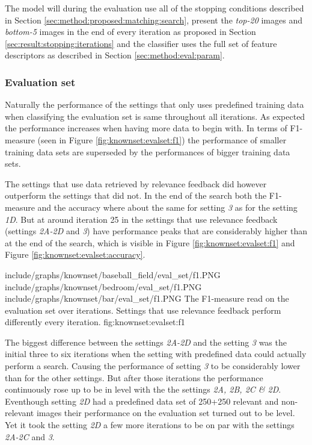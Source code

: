 The model will during the evaluation use all of the stopping conditions described in Section \ref{sec:method:proposed:matching:search}, present the \emph{top-20} images and \emph{bottom-5} images in the end of every iteration as proposed in Section \ref{sec:result:stopping:iterations} and the classifier uses the full set of feature descriptors as described in Section \ref{sec:method:eval:param}. 

\subsubsection{Evaluation set}
\label{sec:res:knownset:eval}
Naturally the performance of the settings that only uses predefined training data when classifying the evaluation set is same throughout all iterations. As expected the performance increases when having more data to begin with. In terms of F1-measure (seen in Figure \ref{fig:knownset:evalset:f1}) the performance of smaller training data sets are superseded by the performances of bigger training data sets. 


The settings that use data retrieved by relevance feedback did however outperform the settings that did not. In the end of the search both the F1-measure and the accuracy where about the same for setting \emph{3} as for the setting \emph{1D}. But at around iteration 25 in the settings that use relevance feedback (settings \emph{2A-2D} and \emph{3}) have performance peaks that are considerably higher than at the end of the search, which is visible in Figure \ref{fig:knownset:evalset:f1} and Figure \ref{fig:knownset:evalset:accuracy}.

\tripfigurenear
{include/graphs/knownset/baseball_field/eval_set/f1.PNG}
{include/graphs/knownset/bedroom/eval_set/f1.PNG}
{include/graphs/knownset/bar/eval_set/f1.PNG}
{The F1-measure read on the evaluation set over iterations. Settings that use relevance feedback perform differently every iteration.}
{fig:knownset:evalset:f1}

The biggest difference between the settings \emph{2A-2D} and the setting \emph{3} was the initial three to six iterations when the setting with predefined data could actually perform a search. Causing the performance of setting \emph{3} to be considerably lower than for the other settings. But after those iterations the performance continuously rose up to be in level with the the settings \emph{2A, 2B, 2C \& 2D}. Eventhough setting \emph{2D} had a predefined data set of 250+250 relevant and non-relevant images their performance on the evaluation set turned out to be level. Yet it took the setting \emph{2D} a few more iterations to be on par with the settings \emph{2A-2C} and \emph{3}.

